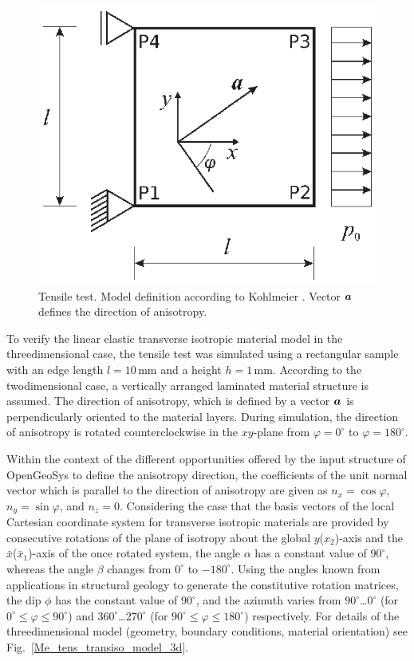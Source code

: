 \begin{figure}[!htb]
\begin{center}
\includegraphics[scale=0.95]{PART_II/M/tenstest_model_mod.eps}
\end{center}
\caption{Tensile test. Model definition according to Kohlmeier \cite{Kohlmeier:2006}. Vector $\mbox{${\mbox{\boldmath${a}$\unboldmath}}_{\:\!}$}$ defines the direction of anisotropy.}
\label{Me_tens_transiso_model_2d}
\end{figure}

To verify the linear elastic transverse isotropic material model in the threedimensional case, the tensile test was simulated using a rectangular sample with an edge length $l=10\,$mm and a height $h=1\,$mm. According to the twodimensional case, a vertically arranged laminated material structure is assumed. The direction of anisotropy, which is defined by a vector $\mbox{${\mbox{\boldmath${a}$\unboldmath}}_{\:\!}$}$ is perpendicularly oriented to the material layers. During simulation, the direction of anisotropy is rotated counterclockwise in the $xy$-plane from $\varphi=0^{\circ}$ to $\varphi=180^{\circ}$. 

Within the context of the different opportunities offered by the input structure of OpenGeoSys to define the anisotropy direction, the coefficients of the unit normal vector which is parallel to the direction of anisotropy are given as $n_x=\cos\varphi$, $n_y=\sin\varphi$, and $n_z=0$. Considering the case that the basis vectors of the local Cartesian coordinate system for transverse isotropic materials are provided by consecutive rotations of the plane of isotropy about the global $y$($x_2$)-axis and the $\bar{x}$($\bar{x}_1$)-axis of the once rotated system, the angle $\alpha$ has a constant value of $90^{\circ}$, whereas the angle $\beta$ changes from $0^{\circ}$ to $-180^{\circ}$. Using the angles known from applications in structural geology to generate the constitutive rotation matrices, the dip $\phi$ has the constant value of $90^{\circ}$, and the azimuth varies from $90^{\circ}$\dots$0^{\circ}$ (for $0^{\circ}\leq\varphi\leq 90^{\circ}$) and $360^{\circ}$\dots$270^{\circ}$ (for $90^{\circ}\leq\varphi\leq 180^{\circ}$) respectively. For details of the threedimensional model (geometry, boundary conditions, material orientation) see Fig.~\ref{Me_tens_transiso_model_3d}.

